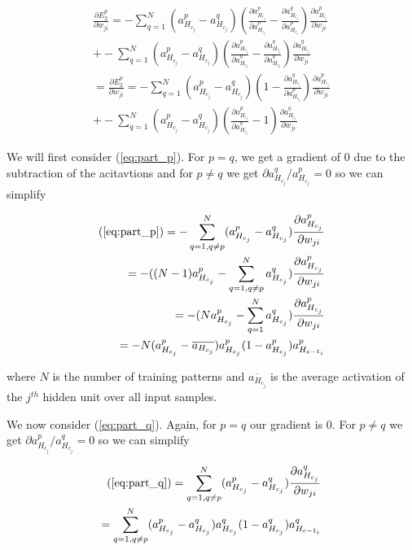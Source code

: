 \begin{align}
  \frac{\partial E_2^p}{\partial w_{ji}} = - \sum_{q=1}^N (a_{H_{c_j}}^p-a_{H_{c_j}}^q)(\frac{\partial a_{H_{c_j}}^p}{\partial a_{H_{c_j}}^p}-\frac{\partial a_{H_{c_j}}^q}{\partial a_{H_{c_j}}^p})\frac{\partial a_{H_{c_j}}^p}{\partial w_{ji}} \nonumber \\
  + - \sum_{q=1}^N (a_{H_{c_j}}^p-a_{H_{c_j}}^q)(\frac{\partial a_{H_{c_j}}^p}{\partial a_{H_{c_j}}^q}-\frac{\partial a_{H_{c_j}}^q}{\partial a_{H_{c_j}}^q})\frac{\partial a_{H_{c_j}}^q}{\partial w_{ji}} \nonumber \\
  = \frac{\partial E_2^p}{\partial w_{ji}} = - \sum_{q=1}^N (a_{H_{c_j}}^p-a_{H_{c_j}}^q)(1-\frac{\partial a_{H_{c_j}}^q}{\partial a_{H_{c_j}}^p})\frac{\partial a_{H_{c_j}}^p}{\partial w_{ji}} \label{eq:part_p}\\
  + - \sum_{q=1}^N (a_{H_{c_j}}^p-a_{H_{c_j}}^q)(\frac{\partial a_{H_{c_j}}^p}{\partial a_{H_{c_j}}^q}-1)\frac{\partial a_{H_{c_j}}^q}{\partial w_{ji}} \label{eq:part_q}
\end{align}


We will first consider (\ref{eq:part_p}). For $p = q$, we get a
gradient of $0$ due to the subtraction of the acitavtions
and for $p \neq q$ we get $\partial a_{H_{c_j}}^q / a_{H_{c_j}}^p = 0$ so
we can simplify

\begin{align}
  (\ref{eq:part_p}) = - \sum_{q=1, q \neq p}^N (a_{H_{c_j}}^p-a_{H_{c_j}}^q)\frac{\partial a_{H_{c_j}}^p}{\partial w_{ji}} \nonumber \\
  = -((N-1)a_{H_{c_j}}^p - \sum_{q=1, q \neq p}^N a_{H_{c_j}}^q)\frac{\partial a_{H_{c_j}}^p}{\partial w_{ji}} \nonumber \\
  = -(N a_{H_{c_j}}^p - \sum_{q=1}^N a_{H_{c_j}}^q) \frac{\partial a_{H_{c_j}}^p}{\partial w_{ji}} \nonumber \\
  = -N(a_{H_{c_j}}^p-\overline{a_{H_{c_j}}}) a_{H_{c_j}}^p(1-a_{H_{c_j}}^p) a_{H_{c-1_i}}^p
\label{eq:part_p_simplify}
\end{align}

where $N$ is the number of training patterns and $\overline{a_{H_{c_j}}}$ is the
average activation of the $j^{th}$ hidden unit over all input samples. 

We now consider (\ref{eq:part_q}). Again, for $p=q$ our gradient is $0$.
For $p \neq q$ we get  $\partial a_{H_{c_j}}^p / a_{H_{c_j}}^q = 0$ so we can simplify

\begin{align} \label{eq:part_q_simplify}
  (\ref{eq:part_q}) = \sum_{q=1, q \neq p}^N (a_{H_{c_j}}^p-a_{H_{c_j}}^q)\frac{\partial a_{H_{c_j}}^q}{\partial w_{ji}} \nonumber \\
  = \sum_{q=1, q \neq p}^N (a_{H_{c_j}}^p-a_{H_{c_j}}^q) a_{H_{c_j}}^q(1-a_{H_{c_j}}^q) a_{H_{c-1_i}}^q 
\end{align}

